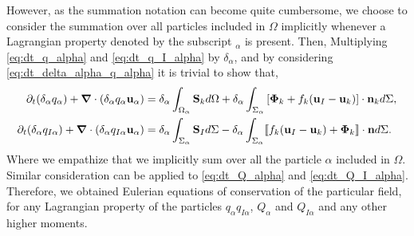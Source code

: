 However, as the summation notation can become quite cumbersome, we choose to consider the summation over all particles included in $\Omega$ implicitly whenever a Lagrangian property denoted by the subscript $_\alpha$ is present.
Then, Multiplying \ref{eq:dt_q_alpha} and \ref{eq:dt_q_I_alpha} by $\delta_\alpha$, and by considering \ref{eq:dt_delta_alpha_q_alpha} it is trivial to show that,
\begin{align}
    \partial_t (\delta_\alpha q_\alpha)
    + \bm{\nabla} \cdot (\delta_\alpha q_\alpha \textbf{u}_\alpha)
    &= \delta_\alpha\int_{\Omega_\alpha} \textbf{S}_k d\Omega
    + \delta_\alpha\int_{\Sigma_\alpha} \left[\bm{\Phi}_k + f_k (\textbf{u}_I-\textbf{u}_k) \right] \cdot \textbf{n}_k d\Sigma,
    \label{eq:dt_dq_alpha}\\
    \partial_t (\delta_\alpha q_{I\alpha})
    + \bm{\nabla} \cdot(\delta_\alpha q_{I\alpha} \textbf{u}_\alpha)
    &= \delta_\alpha\int_{\Sigma_\alpha} 
        \textbf{S}_I
    d\Sigma
    - \delta_\alpha\int_{\Sigma_\alpha} \llbracket 
        f_k (\textbf{u}_I - \textbf{u}_k)
        + \mathbf{\Phi}_k
     \rrbracket \cdot \textbf{n}
    d\Sigma.
    \label{eq:dt_dq_I_alpha}
\end{align}
Where we empathize that we implicitly sum over all the particle $\alpha$ included in $\Omega$. 
Similar consideration can be applied to \ref{eq:dt_Q_alpha} and \ref{eq:dt_Q_I_alpha}.
Therefore, we obtained Eulerian equations of conservation of the particular field, for any Lagrangian property of the particles $q_\alpha$\;$q_{I\alpha}$, $Q_\alpha$ and $Q_{I\alpha}$ and any other higher moments. 

